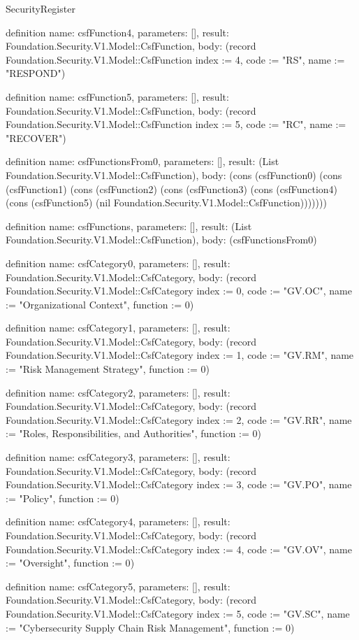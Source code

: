 \begin{lexlean}{SecurityRegister}
\begin{semanticmodule}
definition{
  name: csfFunction4,
  parameters: [],
  result: Foundation.Security.V1.Model::CsfFunction,
  body: (record Foundation.Security.V1.Model::CsfFunction {index := 4, code := "RS", name := "RESPOND"})
}

definition{
  name: csfFunction5,
  parameters: [],
  result: Foundation.Security.V1.Model::CsfFunction,
  body: (record Foundation.Security.V1.Model::CsfFunction {index := 5, code := "RC", name := "RECOVER"})
}

definition{
  name: csfFunctionsFrom0,
  parameters: [],
  result: (List Foundation.Security.V1.Model::CsfFunction),
  body: (cons (csfFunction0) (cons (csfFunction1) (cons (csfFunction2) (cons (csfFunction3) (cons (csfFunction4) (cons (csfFunction5) (nil Foundation.Security.V1.Model::CsfFunction)))))))
}

definition{
  name: csfFunctions,
  parameters: [],
  result: (List Foundation.Security.V1.Model::CsfFunction),
  body: (csfFunctionsFrom0)
}

definition{
  name: csfCategory0,
  parameters: [],
  result: Foundation.Security.V1.Model::CsfCategory,
  body: (record Foundation.Security.V1.Model::CsfCategory {index := 0, code := "GV.OC", name := "Organizational Context", function := 0})
}

definition{
  name: csfCategory1,
  parameters: [],
  result: Foundation.Security.V1.Model::CsfCategory,
  body: (record Foundation.Security.V1.Model::CsfCategory {index := 1, code := "GV.RM", name := "Risk Management Strategy", function := 0})
}

definition{
  name: csfCategory2,
  parameters: [],
  result: Foundation.Security.V1.Model::CsfCategory,
  body: (record Foundation.Security.V1.Model::CsfCategory {index := 2, code := "GV.RR", name := "Roles, Responsibilities, and Authorities", function := 0})
}

definition{
  name: csfCategory3,
  parameters: [],
  result: Foundation.Security.V1.Model::CsfCategory,
  body: (record Foundation.Security.V1.Model::CsfCategory {index := 3, code := "GV.PO", name := "Policy", function := 0})
}

definition{
  name: csfCategory4,
  parameters: [],
  result: Foundation.Security.V1.Model::CsfCategory,
  body: (record Foundation.Security.V1.Model::CsfCategory {index := 4, code := "GV.OV", name := "Oversight", function := 0})
}

definition{
  name: csfCategory5,
  parameters: [],
  result: Foundation.Security.V1.Model::CsfCategory,
  body: (record Foundation.Security.V1.Model::CsfCategory {index := 5, code := "GV.SC", name := "Cybersecurity Supply Chain Risk Management", function := 0})
}


\end{semanticmodule}
\end{lexlean}
